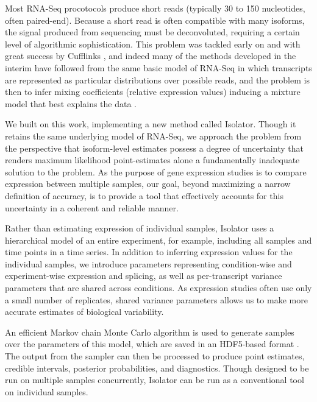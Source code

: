 \documentclass[twocolumn]{article}
\begin{document}
Most RNA-Seq procotocols produce short reads (typically 30 to 150 nucleotides,
often paired-end).  Because a short read is often compatible with many isoforms,
the signal produced from sequencing must be deconvoluted, requiring a certain
level of algorithmic sophistication. This problem was tackled early on and with
great success by Cufflinks \cite{Trapnell:2010kd}, and indeed many of the
methods developed in the interim have followed from the same basic model of
RNA-Seq in which transcripts are represented as particular distributions over
possible reads, and the problem is then to infer mixing coefficients (relative
expression values) inducing a mixture model that best explains the data
\cite{Pachter:2011wm}.

We built on this work, implementing a new method called Isolator. Though
it retains the same underlying model of RNA-Seq, we approach the problem
from the perspective that isoform-level estimates possess a degree of
uncertainty that renders maximum likelihood point-estimates alone a
fundamentally inadequate solution to the problem. As the purpose of gene
expression studies is to compare expression between multiple samples,
our goal, beyond maximizing a narrow definition of accuracy, is to
provide a tool that effectively accounts for this uncertainty in a
coherent and reliable manner.

Rather than estimating expression of individual samples, Isolator uses a
hierarchical model of an entire experiment, for example, including all samples
and time points in a time series. In addition to inferring expression values for
the individual samples, we introduce parameters representing condition-wise and
experiment-wise expression and splicing, as well as per-transcript variance
parameters that are shared across conditions. As expression studies often use
only a small number of replicates, shared variance parameters allows us to make
more accurate estimates of biological variability.

An efficient Markov chain Monte Carlo algorithm is used to generate samples over
the parameters of this model, which are saved in an HDF5-based format
\cite{hdf5}. The output from the sampler can then be processed to produce point
estimates, credible intervals, posterior probabilities, and diagnostics. Though
designed to be run on multiple samples concurrently, Isolator can be run as a
conventional tool on individual samples.
\end{document}

